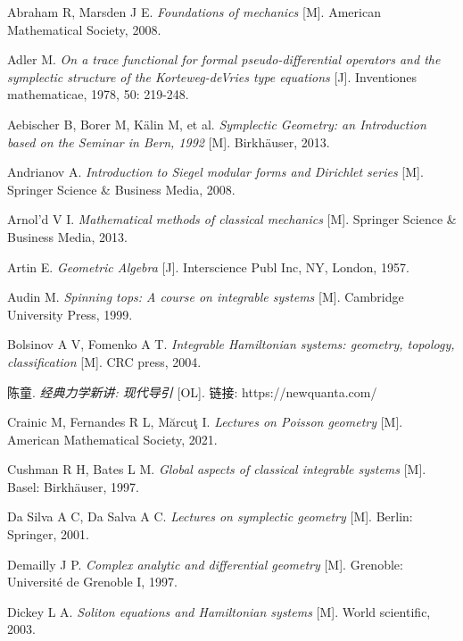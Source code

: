 \documentclass[12pt, b5paper]{article}   %
\begin{document}

\newpage
\begin{thebibliography}{99}
Abraham R, Marsden J E.
\textit{Foundations of mechanics} [M]. American Mathematical Society, 2008.

Adler M.
\textit{On a trace functional for formal pseudo-differential operators and the symplectic structure of the Korteweg-deVries type equations} [J].
Inventiones mathematicae, 1978, 50: 219-248.

Aebischer B, Borer M, Kälin M, et al.
\textit{Symplectic Geometry: an Introduction based on the Seminar in Bern, 1992} [M]. Birkhäuser, 2013.

Andrianov A.
\textit{Introduction to Siegel modular forms and Dirichlet series}
[M]. Springer Science \& Business Media, 2008.

Arnol'd V I.
\textit{Mathematical methods of classical mechanics} [M].
Springer Science \& Business Media, 2013.

Artin E.
\textit{Geometric Algebra} [J]. Interscience Publ Inc, NY, London, 1957.

Audin M.
\textit{Spinning tops: A course on integrable systems} [M]. Cambridge University Press, 1999.

Bolsinov A V, Fomenko A T.
\textit{Integrable Hamiltonian systems: geometry, topology, classification} [M]. CRC press, 2004.

陈童. \textit{经典力学新讲: 现代导引} [OL].
链接: https://newquanta.com/

Crainic M, Fernandes R L, Mărcuţ I.
\textit{Lectures on Poisson geometry} [M]. American Mathematical Society, 2021.

Cushman R H, Bates L M.
\textit{Global aspects of classical integrable systems} [M]. Basel: Birkhäuser, 1997.

Da Silva A C, Da Salva A C.
\textit{Lectures on symplectic geometry} [M]. Berlin: Springer, 2001.

Demailly J P.
\textit{Complex analytic and differential geometry} [M]. Grenoble: Université de Grenoble I, 1997.

Dickey L A.
\textit{Soliton equations and Hamiltonian systems} [M]. World scientific, 2003.


\end{thebibliography}
\end{document}
